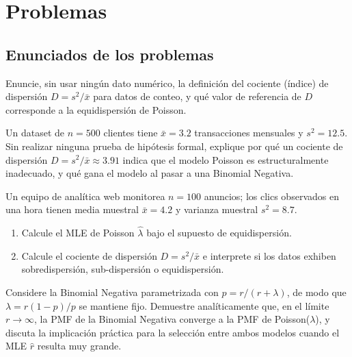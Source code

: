 \section*{Problemas}

\subsection*{Enunciados de los problemas}

\begin{problema}
	\label{prob:9b48fd0}
	Enuncie, sin usar ningún dato numérico, la definición del cociente (índice) de dispersión $D = s^2/\bar{x}$ para datos de conteo, y qué valor de referencia de $D$ corresponde a la equidispersión de Poisson.
\end{problema}

\begin{problema}
	\label{prob:65ac238}
	Un dataset de $n=500$ clientes tiene $\bar{x}=3.2$ transacciones mensuales y $s^2=12.5$. Sin realizar ninguna prueba de hipótesis formal, explique por qué un cociente de dispersión $D=s^2/\bar{x}\approx3.91$ indica que el modelo Poisson es estructuralmente inadecuado, y qué gana el modelo al pasar a una Binomial Negativa.
\end{problema}

\begin{problema}
	\label{prob:486b84f}
	Un equipo de analítica web monitorea $n=100$ anuncios; los clics observados en una hora tienen media muestral $\bar{x}=4.2$ y varianza muestral $s^2=8.7$.
	\begin{enumerate}
		\item Calcule el MLE de Poisson $\hat{\lambda}$ bajo el supuesto de equidispersión.
		\item Calcule el cociente de dispersión $D=s^2/\bar{x}$ e interprete si los datos exhiben sobredispersión, sub-dispersión o equidispersión.
	\end{enumerate}
\end{problema}

\begin{problema}
	\label{prob:8fd9d7f}
	Considere la Binomial Negativa parametrizada con $p=r/(r+\lambda)$, de modo que $\lambda=r(1-p)/p$ se mantiene fijo. Demuestre analíticamente que, en el límite $r\to\infty$, la PMF de la Binomial Negativa converge a la PMF de Poisson($\lambda$), y discuta la implicación práctica para la selección entre ambos modelos cuando el MLE $\hat{r}$ resulta muy grande.
\end{problema}

